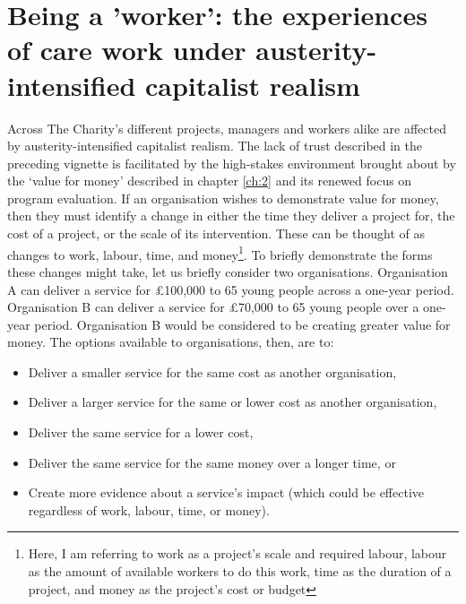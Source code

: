 \section{Being a 'worker': the experiences of care work under austerity-intensified capitalist realism}
Across The Charity's different projects, managers and workers alike are affected by austerity-intensified capitalist realism. The lack of trust described in the preceding vignette is facilitated by the high-stakes environment brought about by the ‘value for money’ described in chapter \ref{ch:2} and its renewed focus on program evaluation. If an organisation wishes to demonstrate value for money, then they must identify a change in either the time they deliver a project for, the cost of a project, or the scale of its intervention. These can be thought of as changes to work, labour, time, and money\footnote{Here, I am referring to work as a project's scale and required labour, labour as the amount of available workers to do this work, time as the duration of a project, and money as the project's cost or budget}. To briefly demonstrate the forms these changes might take, let us briefly consider two organisations. Organisation A can deliver a service for £100,000 to 65 young people across a one-year period. Organisation B can deliver a service for £70,000 to 65 young people over a one-year period. Organisation B would be considered to be creating greater value for money. The options available to organisations, then, are to:
\begin{itemize}
\item Deliver a smaller service for the same cost as another organisation,
\item Deliver a larger service for the same or lower cost as another organisation,
\item Deliver the same service for a lower cost, 
\item Deliver the same service for the same money over a longer time, or
\item Create more evidence about a service's impact (which could be effective regardless of work, labour, time, or money).
\end{itemize}

